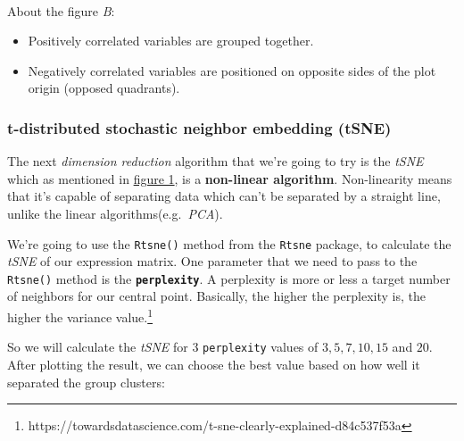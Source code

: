 \documentclass[11pt]{article}
\providecommand{\tightlist}{%
      \setlength{\itemsep}{0pt}\setlength{\parskip}{0pt}}
\begin{document}
    \begin{center}
    \end{center}
    { \hspace*{\fill} \\}
    
    About the figure \emph{B}:

\begin{itemize}
\tightlist
\item
  Positively correlated variables are grouped together.
\item
  Negatively correlated variables are positioned on opposite sides of
  the plot origin (opposed quadrants).
\end{itemize}
\newpage
    \hypertarget{t-distributed-stochastic-neighbor-embedding-tsne}{%
\subsubsection{t-distributed stochastic neighbor embedding
(tSNE)}\label{t-distributed-stochastic-neighbor-embedding-tsne}}

The next \emph{dimension reduction} algorithm that we're going to try is
the \emph{tSNE} which as mentioned in \hyperref[fig-1]{figure 1}, is a
\textbf{non-linear algorithm}. Non-linearity means that it's capable of
separating data which can't be separated by a straight line, unlike the
linear algorithms(e.g.~\emph{PCA}).

We're going to use the \texttt{Rtsne()} method from the \texttt{Rtsne}
package, to calculate the \emph{tSNE} of our expression matrix. One
parameter that we need to pass to the \texttt{Rtsne()} method is the
\textbf{\texttt{perplexity}}. A perplexity is more or less a target
number of neighbors for our central point. Basically, the higher the
perplexity is, the higher the variance value.\footnote{https://towardsdatascience.com/t-sne-clearly-explained-d84c537f53a}

So we will calculate the \emph{tSNE} for 3 \texttt{perplexity} values of
\(3, 5, 7, 10, 15\) and \(20\). After plotting the result, we can choose
the best value based on how well it separated the group clusters:
\end{document}
